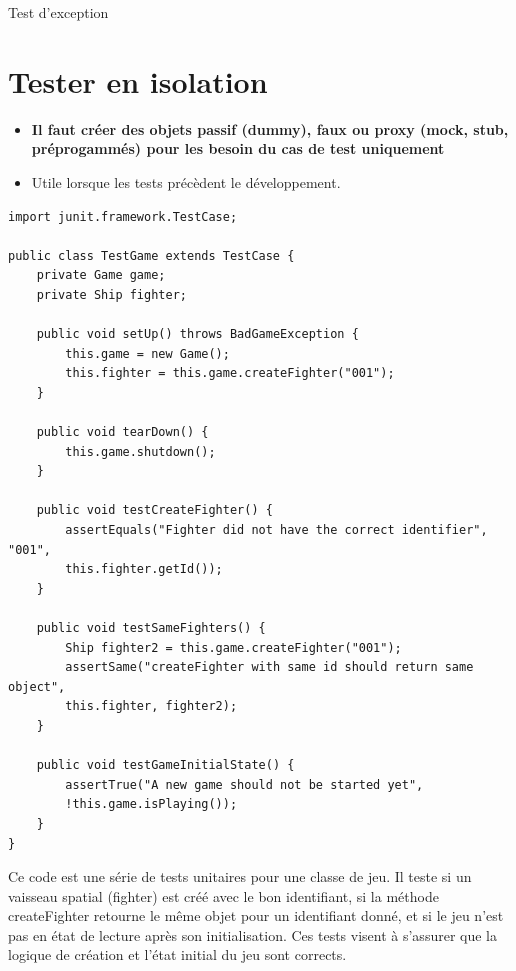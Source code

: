 \documentclass[16pt]{report}
\begin{document}
\begin{multicols*}{2}
\begin{EExample}{Test d'exception}{}
    \end{EExample}


    \section{Tester en isolation}

    \begin{itemize}
        \item \textbf{Il faut créer des objets passif (dummy), faux ou proxy (mock, stub, préprogammés)
            pour les besoin du cas de test uniquement}  
        \item Utile lorsque les tests précèdent le développement. 
    \end{itemize}

\begin{lstlisting}[style=JavaDraculaWhite]
 import junit.framework.TestCase;

public class TestGame extends TestCase {
    private Game game;
    private Ship fighter;

    public void setUp() throws BadGameException {
        this.game = new Game();
        this.fighter = this.game.createFighter("001");
    }

    public void tearDown() {
        this.game.shutdown();
    }

    public void testCreateFighter() {
        assertEquals("Fighter did not have the correct identifier", "001", 
        this.fighter.getId());
    }

    public void testSameFighters() {
        Ship fighter2 = this.game.createFighter("001");
        assertSame("createFighter with same id should return same object", 
        this.fighter, fighter2);
    }

    public void testGameInitialState() {
        assertTrue("A new game should not be started yet", 
        !this.game.isPlaying());
    }
}    

\end{lstlisting}
    Ce code est une série de tests unitaires pour une classe de jeu. Il teste si un vaisseau spatial (fighter) est créé avec le bon identifiant, si la méthode createFighter retourne le même objet pour un identifiant donné, et si le jeu n'est pas en état de lecture après son initialisation. Ces tests visent à s'assurer que la logique de création et l'état initial du jeu sont corrects.



\end{multicols*}
\end{document}

